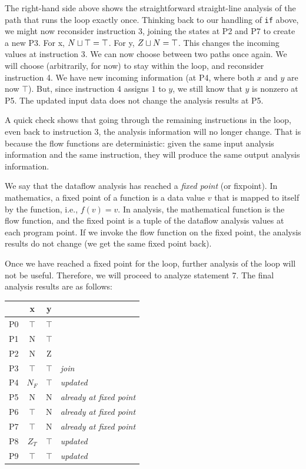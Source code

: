 \documentclass[11pt]{article}
\begin{document}
The right-hand side above shows the straightforward straight-line analysis of the path that runs
the loop exactly once.  Thinking back to our handling of \texttt{if} above, we might now
reconsider instruction 3, joining the states at P2 and P7 to create a new
P3. For x, $N \sqcup \top = \top$.  For y, $Z \sqcup N = \top$.
%
This changes the incoming values at instruction 3. 
We can now choose between two paths once again.  We will choose (arbitrarily, for now) to stay
within the loop, and reconsider instruction 4.  We have new incoming information
(at P4, where
both $x$ and $y$ are now $\top$).  But, since instruction 4 assigns $1$ to
$y$, we still know that $y$ is nonzero at P5. The updated input data does not
change the analysis results at P5.

A quick check shows that going through the remaining instructions in the loop,
even back to instruction 3, the analysis information will no longer change.
That is because the flow functions are deterministic: given the same input
analysis information and the same instruction, they will produce the same output
analysis information.  

We say that the dataflow analysis has reached a \textit{fixed
  point} (or fixpoint).  In
mathematics, a fixed point of a function is a data value $v$ that is mapped to
itself by the function, i.e., $f(v) = v$.  In analysis, the mathematical
function is the flow function, and the fixed point is a tuple of the dataflow
analysis values at each program point.  If
we invoke the flow function on the fixed point, the analysis results do not
change (we get the same fixed point back).

Once we have reached a fixed point for the loop,
further analysis of the loop will not be useful.  Therefore, we will
proceed to analyze statement 7.  The final analysis results are as follows:

\tablespace
\begin{center}
\begin{tabular}{r | c c l}

  & x & y & \\
\hline
P0 & $\top$ & $\top$ & \\
P1 & N & $\top$ & \\
P2 & N & Z  &   \\
P3 & $\top$ & $\top$ &  \textit{join} \\
P4 & $N_F$ & $\top$ & \textit{updated} \\
P5 & N & N & \textit{already at fixed point} \\
P6 & $\top$ & N &  \textit{already at fixed point} \\
P7 & $\top$ & N & \textit{already at fixed point} \\
P8 & $Z_T$ & $\top$ &  \textit{updated}  \\
P9 & $\top$ & $\top$ &  \textit{updated}  \\
\end{tabular}
\end{center}
\tablespace
\end{document}
